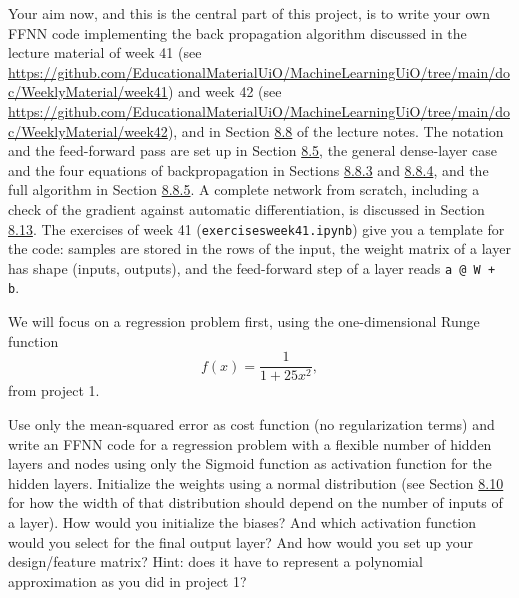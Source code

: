 \documentclass[11pt,a4paper]{article}
\begin{document}
Your aim now, and this is the central part of this project, is to write your
own FFNN code implementing the back propagation algorithm discussed in the
lecture material of week 41 (see
\url{https://github.com/EducationalMaterialUiO/MachineLearningUiO/tree/main/doc/WeeklyMaterial/week41})
and week 42 (see
\url{https://github.com/EducationalMaterialUiO/MachineLearningUiO/tree/main/doc/WeeklyMaterial/week42}),
and in Section
\href{https://educationalmaterialuio.github.io/MachineLearningUiO/doc/LectureNotes/_build/html/chapter8.html#backpropagation}{8.8}
of the lecture notes.  The notation and the feed-forward pass are set up in
Section
\href{https://educationalmaterialuio.github.io/MachineLearningUiO/doc/LectureNotes/_build/html/chapter8.html#notation-and-the-feed-forward-pass}{8.5},
the general dense-layer case and the four equations of backpropagation in
Sections
\href{https://educationalmaterialuio.github.io/MachineLearningUiO/doc/LectureNotes/_build/html/chapter8.html#the-general-case-dense-layers}{8.8.3}
and
\href{https://educationalmaterialuio.github.io/MachineLearningUiO/doc/LectureNotes/_build/html/chapter8.html#the-four-equations-of-backpropagation}{8.8.4},
and the full algorithm in Section
\href{https://educationalmaterialuio.github.io/MachineLearningUiO/doc/LectureNotes/_build/html/chapter8.html#the-algorithm}{8.8.5}.
A complete network from scratch, including a check of the gradient against
automatic differentiation, is discussed in Section
\href{https://educationalmaterialuio.github.io/MachineLearningUiO/doc/LectureNotes/_build/html/chapter8.html#a-neural-network-from-scratch}{8.13}.
The exercises of week 41 (\texttt{exercisesweek41.ipynb}) give you a
template for the code: samples are stored in the rows of the input, the
weight matrix of a layer has shape (inputs, outputs), and the feed-forward
step of a layer reads \texttt{a @ W + b}.

We will focus on a regression problem first, using the one-dimensional Runge
function
\[
  f(x) = \frac{1}{1+25x^2},
\]
from project 1.

Use only the mean-squared error as cost function (no regularization terms)
and write an FFNN code for a regression problem with a flexible number of
hidden layers and nodes using only the Sigmoid function as activation
function for the hidden layers.  Initialize the weights using a normal
distribution (see Section
\href{https://educationalmaterialuio.github.io/MachineLearningUiO/doc/LectureNotes/_build/html/chapter8.html#weight-initialisation}{8.10}
for how the width of that distribution should depend on the number of inputs
of a layer).  How would you initialize the biases?  And which activation
function would you select for the final output layer?  And how would you set
up your design/feature matrix?  Hint: does it have to represent a polynomial
approximation as you did in project 1?
\end{document}
